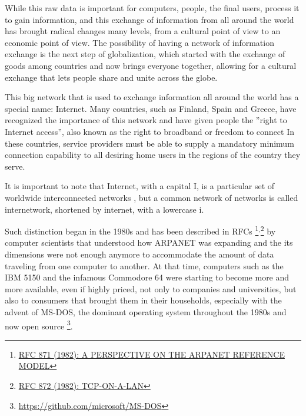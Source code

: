 	While this raw data is important for computers, people, the final users, process it to gain information, and this exchange of information from all around the world has brought radical changes many levels, from a cultural point of view to an economic point of view.
	The possibility of having a network of information exchange is the next step of globalization, which started with the exchange of goods among countries and now brings everyone together, allowing for a cultural exchange that lets people share and unite across the globe.
	
	This big network that is used to exchange information all around the world has a special name: Internet.
	Many countries, such as Finland, Spain and Greece, have recognized the importance of this network and have given people the ''right to Internet access'', also known as the right to broadband or freedom to connect
	In these countries, service providers must be able to supply a mandatory minimum connection capability to all desiring home users in the regions of the country they serve.
	
	It is important to note that Internet, with a capital I, is a particular set of worldwide interconnected networks \cite{gg243376}, but a common network of networks is called internetwork, shortened by internet, with a lowercase i.
	
	Such distinction began in the 1980s and has been described in RFCs \footnote{\href{https://datatracker.ietf.org/doc/html/rfc871}{RFC 871 (1982): A PERSPECTIVE ON THE ARPANET REFERENCE MODEL}}$^{,}$\footnote{\href{https://datatracker.ietf.org/doc/html/rfc872}{RFC 872 (1982): TCP-ON-A-LAN}} by computer scientists that understood how ARPANET was expanding and the its dimensions were not enough anymore to accommodate the amount of data traveling from one computer to another.
	At that time, computers such as the IBM 5150 and the infamous Commodore 64 were starting to become more and more available, even if highly priced, not only to companies and universities, but also to consumers that brought them in their households, especially with the advent of MS-DOS, the dominant operating system throughout the 1980s and now open source \footnote{\url{https://github.com/microsoft/MS-DOS}}.
	
